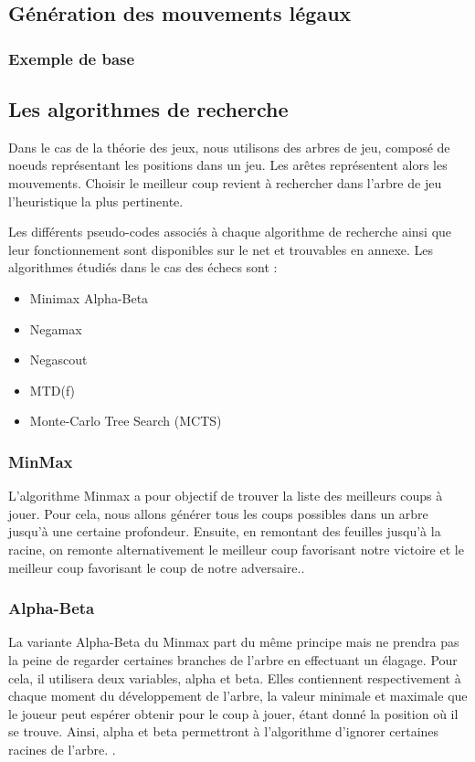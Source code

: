 \huge\documentclass{article}
\begin{document}
    \subsection{Génération des mouvements légaux}
    \subsubsection{Exemple de base}
    \subsection{Les algorithmes de recherche}
    Dans le cas de la théorie des jeux, nous utilisons des arbres de jeu, composé de noeuds représentant les positions dans un jeu. Les arêtes représentent alors les mouvements. Choisir le meilleur coup revient à rechercher dans l'arbre de jeu l'heuristique la plus pertinente.

    Les différents pseudo-codes associés à chaque algorithme de recherche ainsi que leur fonctionnement sont disponibles sur le net et trouvables en annexe. Les algorithmes étudiés dans le cas des échecs sont :

    \begin{itemize}
        \item Minimax Alpha-Beta\cite{Minmax-ab}
        \item Negamax \cite{Negamax}
        \item Negascout \cite{Negascout}
        \item MTD(f) \cite{MTD(f)}
        \item Monte-Carlo Tree Search (MCTS) \cite{MCTS}
    \end{itemize}

    \subsubsection{MinMax}
    L'algorithme Minmax a pour objectif de trouver la liste des meilleurs coups à jouer. Pour cela, nous allons générer tous les coups possibles dans un arbre jusqu'à une certaine profondeur. Ensuite, en remontant des feuilles jusqu'à la racine, on remonte alternativement le meilleur coup favorisant notre victoire et le meilleur coup favorisant le coup de notre adversaire.\cite{Heuristiques}.

    \subsubsection{Alpha-Beta}
    La variante Alpha-Beta du Minmax part du même principe mais ne prendra pas la peine de regarder certaines branches de l'arbre en effectuant un élagage. Pour cela, il utilisera deux variables, alpha et beta. Elles contiennent respectivement à chaque moment du développement de l'arbre, la valeur minimale et maximale que le joueur peut espérer obtenir pour le coup à jouer, étant donné la position où il se trouve. Ainsi, alpha et beta permettront à l'algorithme d'ignorer certaines racines de l'arbre. \cite{Heuristiques}.
\end{document}
